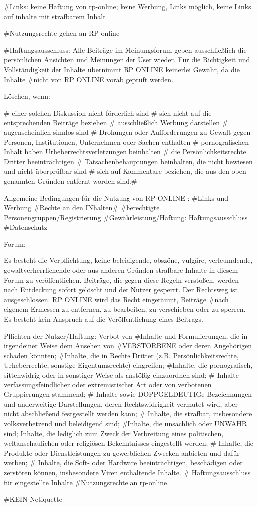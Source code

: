  #Links: keine Haftung von rp-online; keine Werbung, Links möglich, keine Links auf inhalte mit strafbarem Inhalt
 
 #Nutzungsrechte gehen an RP-online
 
 #Haftungsausschluss: Alle Beiträge im Meinungsforum geben ausschließlich die persönlichen Ansichten und Meinungen der User wieder. Für die Richtigkeit und Vollständigkeit der Inhalte übernimmt RP ONLINE keinerlei Gewähr, da die Inhalte #nicht von RP ONLINE vorab geprüft werden.
 
 Löschen, wenn: 
 
   # einer solchen Diskussion nicht förderlich sind
  #  sich nicht auf die entsprechenden Beiträge beziehen
  #  ausschließlich Werbung darstellen
 #   augenscheinlich sinnlos sind
  #  Drohungen oder Aufforderungen zu Gewalt gegen Personen, Institutionen, Unternehmen oder Sachen enthalten
   # pornografischen Inhalt haben
    Urheberrechtsverletzungen beinhalten
 #   die Persönlichkeitsrechte Dritter beeinträchtigen
  #  Tatsachenbehauptungen beinhalten, die nicht bewiesen und nicht überprüfbar sind
  #  sich auf Kommentare beziehen, die aus den oben genannten Gründen entfernt worden sind.#


Allgemeine Bedingungen für die Nutzung von RP ONLINE :
	#Links und Werbung
	#Rechte an den INhalten#
	#berechtigte Personengruppen/Registrierung
	#Gewährleistung/Haftung: Haftungsausschluss
	#Datenschutz
	
	Forum: 
	
	Es besteht die Verpflichtung, keine beleidigende, obszöne, vulgäre, verleumdende, gewaltverherrlichende oder aus anderen Gründen strafbare Inhalte in diesem Forum zu veröffentlichen. Beiträge, die gegen diese Regeln verstoßen, werden nach Entdeckung sofort gelöscht und der Nutzer gesperrt. Der Rechtsweg ist ausgeschlossen. RP ONLINE wird das Recht eingeräumt, Beiträge #nach eigenem Ermessen zu entfernen, zu bearbeiten, zu verschieben oder zu sperren. Es besteht kein Anspruch auf die Veröffentlichung eines Beitrags. 
	
	Pflichten der Nutzer/Haftung: Verbot von
	#Inhalte und Formulierungen, die in irgendeiner Weise dem Ansehen von #VERSTORBENE oder deren Angehörigen schaden könnten;
    #Inhalte, die in Rechte Dritter (z.B. Persönlichkeitsrechte, Urheberrechte, sonstige Eigentumsrechte) eingreifen;
    #Inhalte, die pornografisch, sittenwidrig oder in sonstiger Weise als anstößig einzuordnen sind;
  #  Inhalte verfassungsfeindlicher oder extremistischer Art oder von verbotenen Gruppierungen stammend;
  #  Inhalte sowie DOPPGELDEUTIGe Bezeichnungen und anderweitige Darstellungen, deren Rechtswidrigkeit vermutet wird, aber nicht abschließend festgestellt werden kann;
  #  Inhalte, die strafbar, insbesondere volksverhetzend und beleidigend sind;
    #Inhalte, die unsachlich oder UNWAHR sind;
    Inhalte, die lediglich zum Zweck der Verbreitung eines politischen, weltanschaulichen oder religiösen Bekenntnisses eingestellt werden;
   # Inhalte, die Produkte oder Dienstleistungen zu gewerblichen Zwecken anbieten und dafür werben;
   # Inhalte, die Soft- oder Hardware beeinträchtigen, beschädigen oder zerstören können, insbesondere Viren enthaltende Inhalte.
  #  Haftungsausschluss für eingestellte Inhalte
    #Nutzungsrechte an rp-online

#KEIN Netiquette









